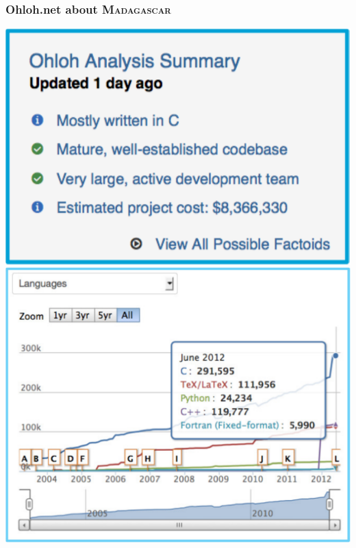 \begin{frame}
\MadLogo
\frametitle{Ohloh.net about \textsc{Madagascar}}

\begin{minipage}{0.65\textwidth}
  \includegraphics[height=0.3\textheight]{Fig/ohloh0} 
  \includegraphics[width=\textwidth]{Fig/ohloh3}
\end{minipage}


\end{frame}


